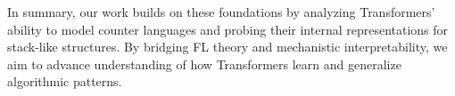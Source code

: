 In summary, our work builds on these foundations by analyzing Transformers' ability to model counter languages and probing their internal representations for stack-like structures. By bridging FL theory and mechanistic interpretability, we aim to advance understanding of how Transformers learn and generalize algorithmic patterns.